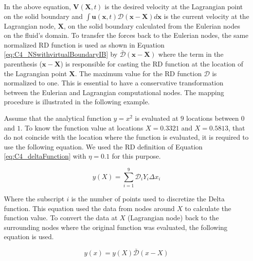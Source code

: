In the above equation, $\mathbf{V}(\mathbf{X}, t)$ is the desired velocity at the Lagrangian point on the solid boundary and $\int \mathbf{u}(\mathbf{x}, t) \mathcal{D}(\mathbf{x} - \mathbf{X}) d\mathbf{x}$ is the current velocity at the Lagrangian node, $\mathbf{X}$, on the solid boundary calculated from the Eulerian nodes on the fluid's domain. To transfer the forces back to the Eulerian nodes, the same normalized RD function is used as shown in Equation \eqref{eq:C4_NSwithvirtualBoundaryIB} by $\bar{\mathcal{D}}(\mathbf{x} - \mathbf{X})$ where the term in the parenthesis ($\mathbf{x} - \mathbf{X}$) is responsible for casting the RD function at the location of the Lagrangian point $\mathbf{X}$. The maximum value for the RD function $\mathcal{D}$ is normalized to one. This is essential to have a conservative transformation between the Eulerian and Lagrangian computational nodes. The mapping procedure is illustrated in the following example.

Assume that the analytical function $y=x^2$ is evaluated at $9$ locations between $0$ and $1$. To know the function value at locations $X = 0.3321$ and $X = 0.5813$, that do not coincide with the location where the function is evaluated, it is required to use the following equation. We used the RD definition of Equation \eqref{eq:C4_deltaFunction} with $\eta = 0.1$ for this purpose.

\begin{equation}\label{eq:C4_euler2lagrange}
    y(X) = \sum_{i=1}^9 \mathcal{D}_i Y_i \Delta x_i
\end{equation}

Where the subscript $i$ is the number of points used to discretize the Delta function. This equation used the data from nodes around $X$ to calculate the function value. To convert the data at $X$ (Lagrangian node) back to the surrounding nodes where the original function was evaluated, the following equation is used.

\begin{equation}
    y(x) = y(X) \bar{\mathcal{D}}(x - X)
\end{equation}

